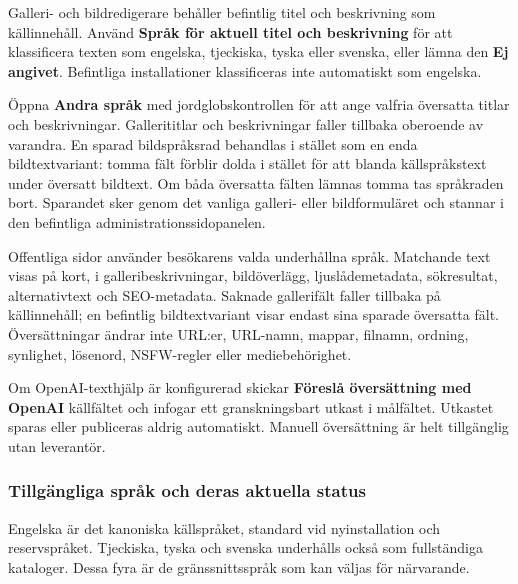 \documentclass[11pt,a4paper]{article}
\newcommand{\ui}[1]{\textbf{#1}}
\begin{document}
Galleri- och bildredigerare behåller befintlig titel och beskrivning som
källinnehåll. Använd \ui{Språk för aktuell titel och beskrivning} för att
klassificera texten som engelska, tjeckiska, tyska eller svenska, eller lämna
den \ui{Ej angivet}. Befintliga installationer klassificeras inte automatiskt
som engelska.

Öppna \ui{Andra språk} med jordglobskontrollen för att ange valfria översatta
titlar och beskrivningar. Gallerititlar och beskrivningar faller tillbaka
oberoende av varandra. En sparad bildspråksrad behandlas i stället som en enda
bildtextvariant: tomma fält förblir dolda i stället för att blanda
källspråkstext under översatt bildtext. Om båda översatta fälten lämnas tomma
tas språkraden bort. Sparandet sker genom det vanliga galleri- eller
bildformuläret och stannar i den befintliga administrationssidopanelen.

Offentliga sidor använder besökarens valda underhållna språk. Matchande text
visas på kort, i galleribeskrivningar, bildöverlägg, ljuslådemetadata,
sökresultat, alternativtext och SEO-metadata. Saknade gallerifält faller
tillbaka på källinnehåll; en befintlig bildtextvariant visar endast sina sparade
översatta fält. Översättningar ändrar inte URL:er, URL-namn, mappar, filnamn,
ordning, synlighet, lösenord, NSFW-regler eller mediebehörighet.

Om OpenAI-texthjälp är konfigurerad skickar \ui{Föreslå översättning med OpenAI}
källfältet och infogar ett granskningsbart utkast i målfältet. Utkastet sparas
eller publiceras aldrig automatiskt. Manuell översättning är helt tillgänglig
utan leverantör.

\subsubsection{Tillgängliga språk och deras aktuella status}

Engelska är det kanoniska källspråket, standard vid nyinstallation och
reservspråket. Tjeckiska, tyska och svenska underhålls också som fullständiga
kataloger. Dessa fyra är de gränssnittsspråk som kan väljas för närvarande.
\end{document}
